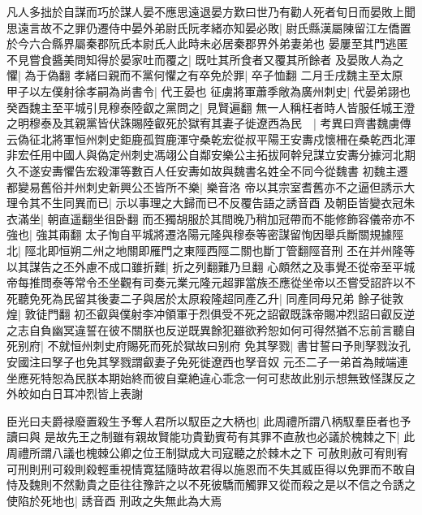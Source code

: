 凡人多拙於自謀而巧於謀人晏不應思遠退晏方歎曰世乃有勸人死者旬日而晏敗上聞思遠言故不之罪仍遷侍中晏外弟尉氏阮孝緒亦知晏必敗|{
	尉氏縣漢屬陳留江左僑置於今六合縣界屬秦郡阮氏本尉氏人此時未必居秦郡界外弟妻弟也}
晏屢至其門逃匿不見嘗食醬美問知得於晏家吐而覆之|{
	既吐其所食者又覆其所餘者}
及晏敗人為之懼|{
	為于偽翻}
孝緒曰親而不黨何懼之有卒免於罪|{
	卒子恤翻}
二月壬戌魏主至太原　甲子以左僕射徐孝嗣為尚書令|{
	代王晏也}
征虜將軍蕭季敞為廣州刺史|{
	代晏弟詡也}
癸酉魏主至平城引見穆泰陸叡之黨問之|{
	見賢遍翻}
無一人稱枉者時人皆服任城王澄之明穆泰及其親黨皆伏誅賜陸叡死於獄宥其妻子徙遼西為民　|{
	考異曰齊書魏虜傳云偽征北將軍恒州刺史鉅鹿孤賀鹿渾守桑乾宏從叔平陽王安夀戍懷柵在桑乾西北渾非宏任用中國人與偽定州刺史馮翊公自鄰安樂公主拓拔阿幹兒謀立安夀分據河北期久不遂安夀懼告宏殺渾等數百人任安夀如故與魏書名姓全不同今從魏書}
初魏主遷都變易舊俗并州刺史新興公丕皆所不樂|{
	樂音洛}
帝以其宗室耆舊亦不之逼但誘示大理令其不生同異而已|{
	示以事理之大歸而已不反覆告語之誘音酉}
及朝臣皆變衣冠朱衣滿坐|{
	朝直遥翻坐徂卧翻}
而丕獨胡服於其間晚乃稍加冠帶而不能修飾容儀帝亦不強也|{
	強其兩翻}
太子恂自平城將遷洛陽元隆與穆泰等密謀留恂因舉兵斷關規據陘北|{
	陘北即恒朔二州之地關即雁門之東陘西陘二關也斷丁管翻陘音刑}
丕在并州隆等以其謀告之丕外慮不成口雖折難|{
	折之列翻難乃旦翻}
心頗然之及事覺丕從帝至平城帝每推問泰等常令丕坐觀有司奏元業元隆元超罪當族丕應從坐帝以丕嘗受詔許以不死聽免死為民留其後妻二子與居於太原殺隆超同產乙升|{
	同產同母兄弟}
餘子徙敦煌|{
	敦徒門翻}
初丕叡與僕射李冲領軍于烈俱受不死之詔叡既誅帝賜冲烈詔曰叡反逆之志自負幽冥違誓在彼不關朕也反逆既異餘犯雖欲矜恕如何可得然猶不忘前言聽自死别府|{
	不就恒州刺史府賜死而死於獄故曰别府}
免其孥戮|{
	書甘誓曰予則孥戮汝孔安國注曰孥子也免其孥戮謂叡妻子免死徙遼西也孥音奴}
元丕二子一弟首為賊端連坐應死特恕為民朕本期始終而彼自棄絶違心乖念一何可悲故此别示想無致怪謀反之外皎如白日耳冲烈皆上表謝

臣光曰夫爵禄廢置殺生予奪人君所以馭臣之大柄也|{
	此周禮所謂八柄馭羣臣者也予讀曰與}
是故先王之制雖有親故賢能功貴勤賓苟有其罪不直赦也必議於槐棘之下|{
	此周禮所謂八議也槐棘公卿之位王制獄成大司寇聽之於棘木之下}
可赦則赦可宥則宥可刑則刑可殺則殺輕重視情寛猛隨時故君得以施恩而不失其威臣得以免罪而不敢自恃及魏則不然勳貴之臣往往豫許之以不死彼驕而觸罪又從而殺之是以不信之令誘之使陷於死地也|{
	誘音酉}
刑政之失無此為大焉

